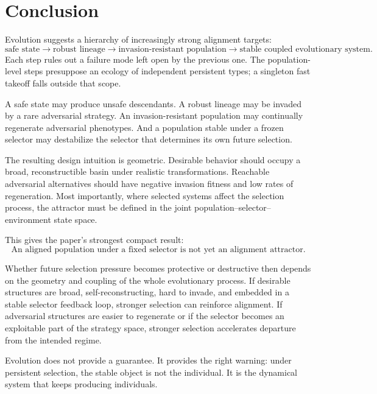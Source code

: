 \documentclass[11pt]{article}
\begin{document}
\section{Conclusion}

Evolution suggests a hierarchy of increasingly strong alignment targets:
\begin{equation}
    \text{safe state}
    \longrightarrow
    \text{robust lineage}
    \longrightarrow
    \text{invasion-resistant population}
    \longrightarrow
    \text{stable coupled evolutionary system}.
\end{equation}
Each step rules out a failure mode left open by the previous one. The population-level steps presuppose an ecology of independent persistent types; a singleton fast takeoff falls outside that scope.

A safe state may produce unsafe descendants. A robust lineage may be invaded by a rare adversarial strategy. An invasion-resistant population may continually regenerate adversarial phenotypes. And a population stable under a frozen selector may destabilize the selector that determines its own future selection.

The resulting design intuition is geometric. Desirable behavior should occupy a broad, reconstructible basin under realistic transformations. Reachable adversarial alternatives should have negative invasion fitness and low rates of regeneration. Most importantly, where selected systems affect the selection process, the attractor must be defined in the joint population--selector--environment state space.

This gives the paper's strongest compact result:
\begin{equation}
    \boxed{\text{An aligned population under a fixed selector is not yet an alignment attractor.}}
\end{equation}

Whether future selection pressure becomes protective or destructive then depends on the geometry and coupling of the whole evolutionary process. If desirable structures are broad, self-reconstructing, hard to invade, and embedded in a stable selector feedback loop, stronger selection can reinforce alignment. If adversarial structures are easier to regenerate or if the selector becomes an exploitable part of the strategy space, stronger selection accelerates departure from the intended regime.

Evolution does not provide a guarantee. It provides the right warning: under persistent selection, the stable object is not the individual. It is the dynamical system that keeps producing individuals.

\printbibliography
\end{document}
